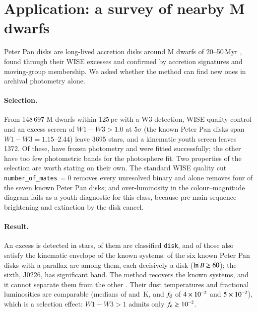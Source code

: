 \documentclass{aa}
\begin{document}
\begin{table}
\caption{Reliability of the reported model probability (main-sequence branch).}
\label{tab:calib}
\centering

\end{table}

\section{Application: a survey of nearby M dwarfs}
\label{sec:survey}

Peter Pan disks are long-lived accretion disks around M dwarfs of 20--50\,Myr
\citep{silverberg2020}, found through their WISE excesses and confirmed by
accretion signatures and moving-group membership. We asked whether the method
can find new ones in archival photometry alone.

\paragraph{Selection.} From 148\,697 M dwarfs within 125\,pc with a W3 detection,
WISE quality control and an excess screen of $W1-W3 > 1.0$ at $5\sigma$ (the known
Peter Pan disks span $W1-W3 = 1.15$--$2.44$) leave 3695 stars, and a kinematic
youth screen leaves 1372. Of these, \svFrozen{} have frozen photometry and \svOK{} were
fitted successfully; the other \svFewBands{} have too few photometric bands for the
photosphere fit. Two properties of the selection are worth stating on their
own. The standard WISE quality cut \texttt{number\_of\_mates}\,$=0$ removes every
unresolved binary and alone removes four of the seven known Peter Pan disks; and
over-luminosity in the colour--magnitude diagram fails as a youth diagnostic for
this class, because pre-main-sequence brightening and extinction by the disk
cancel.

\paragraph{Result.} An excess is detected in \svDet{} stars, \svDetDisk{} of them are classified
\texttt{disk}, and \svPool{} of those also satisfy the kinematic envelope of the known
systems. \svPoolKnown{} of the six known Peter Pan disks with a parallax are among them,
each decisively a disk ($\ln B \ge 60$); the sixth, J0226, has \ppJzzNsig{} significant band. The
method recovers the known systems, and it cannot separate them from the other
\svPoolOther. Their dust temperatures and fractional luminosities are comparable (medians
of \svTdKnown{} and \svTdOther\,K, and $f_{\rm d}$ of $4\times10^{-2}$ and $5\times10^{-2}$),
which is a selection effect:
$W1-W3 > 1$ admits only $f_{\rm d} \gtrsim 10^{-2}$.
\end{document}
